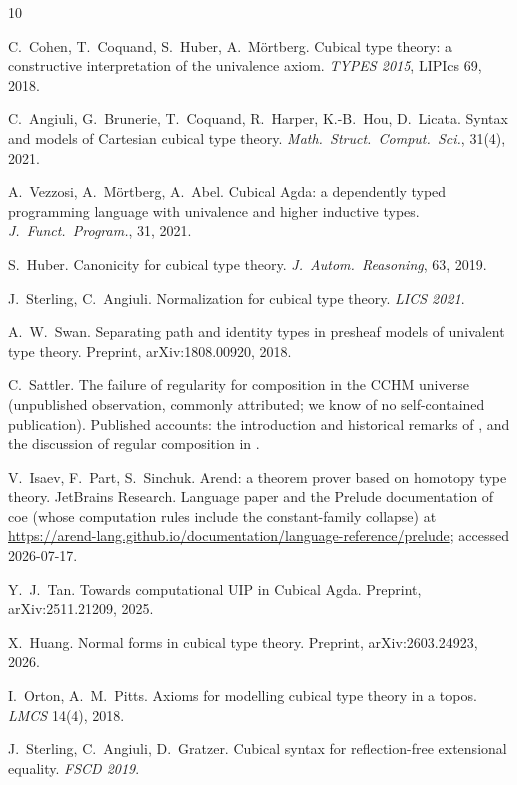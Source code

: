 \documentclass{lmcs}
\begin{document}
\begin{thebibliography}{10}

C.~Cohen, T.~Coquand, S.~Huber, A.~M\"ortberg.
\newblock Cubical type theory: a constructive interpretation of the
  univalence axiom.
\newblock \emph{TYPES 2015}, LIPIcs 69, 2018.

C.~Angiuli, G.~Brunerie, T.~Coquand, R.~Harper, K.-B.~Hou, D.~Licata.
\newblock Syntax and models of Cartesian cubical type theory.
\newblock \emph{Math.\ Struct.\ Comput.\ Sci.}, 31(4), 2021.

A.~Vezzosi, A.~M\"ortberg, A.~Abel.
\newblock Cubical Agda: a dependently typed programming language with
  univalence and higher inductive types.
\newblock \emph{J.\ Funct.\ Program.}, 31, 2021.

S.~Huber.
\newblock Canonicity for cubical type theory.
\newblock \emph{J.\ Autom.\ Reasoning}, 63, 2019.

J.~Sterling, C.~Angiuli.
\newblock Normalization for cubical type theory.
\newblock \emph{LICS 2021}.

A.~W.~Swan.
\newblock Separating path and identity types in presheaf models of
  univalent type theory.
\newblock Preprint, arXiv:1808.00920, 2018.

C.~Sattler.
\newblock The failure of regularity for composition in the CCHM
  universe (unpublished observation, commonly attributed; we know of
  no self-contained publication).
\newblock Published accounts: the introduction and historical
  remarks of \cite{SwanRegularity}, and the discussion of regular
  composition in \cite{CCHM,ABCFHL}.

V.~Isaev, F.~Part, S.~Sinchuk.
\newblock Arend: a theorem prover based on homotopy type theory.
\newblock JetBrains Research.  Language paper and the Prelude
  documentation of \textsf{coe} (whose computation rules include the
  constant-family collapse) at
  \url{https://arend-lang.github.io/documentation/language-reference/prelude};
  accessed 2026-07-17.

Y.~J.~Tan.
\newblock Towards computational UIP in Cubical Agda.
\newblock Preprint, arXiv:2511.21209, 2025.

X.~Huang.
\newblock Normal forms in cubical type theory.
\newblock Preprint, arXiv:2603.24923, 2026.

I.~Orton, A.~M.~Pitts.
\newblock Axioms for modelling cubical type theory in a topos.
\newblock \emph{LMCS} 14(4), 2018.

J.~Sterling, C.~Angiuli, D.~Gratzer.
\newblock Cubical syntax for reflection-free extensional equality.
\newblock \emph{FSCD 2019}.

\end{thebibliography}
\end{document}
